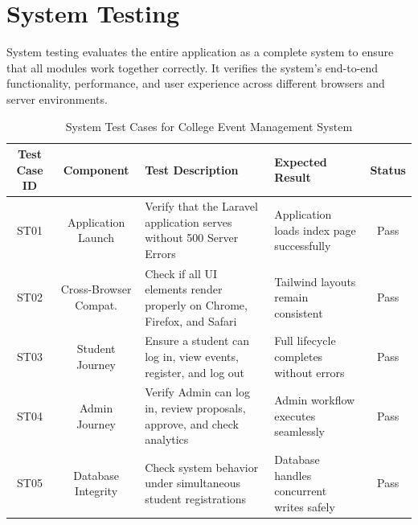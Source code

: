 \newpage
\section{System Testing}
System testing evaluates the entire application as a complete system to ensure that all modules work together correctly. It verifies the system's end-to-end functionality, performance, and user experience across different browsers and server environments.\\
\begin{table}[H]
    \centering
    \renewcommand{\arraystretch}{1.3}
    \begin{tabular}{|c|c|p{4cm}|p{3cm}|c|}
        \hline
        \textbf{Test Case ID} & \textbf{Component} & \textbf{Test Description} & \textbf{Expected Result} & \textbf{Status} \\
        \hline
        ST01 & Application Launch & Verify that the Laravel application serves without 500 Server Errors & Application loads index page successfully & Pass \\
        \hline
        ST02 & Cross-Browser Compat. & Check if all UI elements render properly on Chrome, Firefox, and Safari & Tailwind layouts remain consistent & Pass \\
        \hline
        ST03 & Student Journey & Ensure a student can log in, view events, register, and log out & Full lifecycle completes without errors & Pass \\
        \hline
        ST04 & Admin Journey & Verify Admin can log in, review proposals, approve, and check analytics & Admin workflow executes seamlessly & Pass \\
        \hline
        ST05 & Database Integrity & Check system behavior under simultaneous student registrations & Database handles concurrent writes safely & Pass \\
        \hline
    \end{tabular}
    \caption{System Test Cases for College Event Management System}
    \label{tab:system_tests}
\end{table}

\newpage
